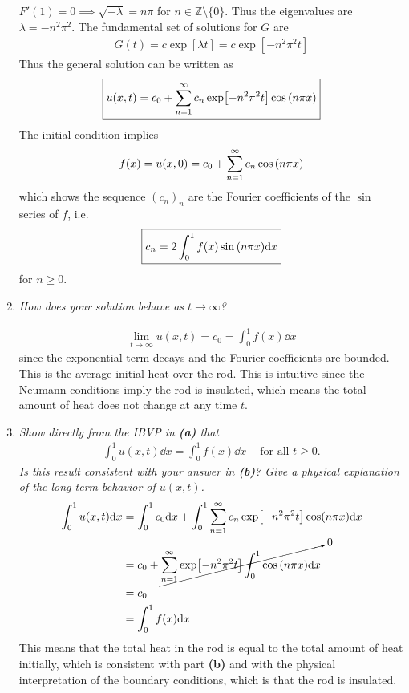 \documentclass[fontsize=11pt]{article} %
\theoremstyle{plain}
\numberwithin{equation}{section} %
\numberwithin{figure}{section} %
\numberwithin{table}{section} %
\begin{document}
\begin{enumerate}[\bf (a)]
        $F'(1) = 0 \implies \sqrt{-\lambda} = n\pi$ for $n \in \mathbb{Z}\setminus\{0\}$.  Thus the eigenvalues are $\lambda = -n^2\pi^2$.  The fundamental set of solutions for $G$ are
        \begin{align*}
            G(t) = c\exp[\lambda t] = c\exp[-n^2\pi^2t]
        \end{align*}
        Thus the general solution can be written as
        \begin{align*}
            \boxed{u(x,t) = c_0 + \sum_{n=1}^\infty c_n \exp[-n^2\pi^2t]\cos\qty(n\pi x)}
        \end{align*}
        The initial condition implies
        \begin{align*}
            f(x) = u(x,0) = c_0 + \sum_{n=1}^\infty c_n \cos\qty(n\pi x)
        \end{align*}
        which shows the sequence $(c_n)_n$ are the Fourier coefficients of the $\sin$ series of $f$, i.e.
        \begin{align*}
            \boxed{c_n = 2\int_0^1 f(x) \sin\qty(n\pi x)\dd x}
        \end{align*}
        for $n \geq 0$.
    \item
        \emph{How does your solution behave as $t \rightarrow \infty$?}

        \begin{align*}
            \lim_{t\rightarrow\infty}u(x,t) = c_0 = \int_0^1 f(x) \dd x
        \end{align*}
        since the exponential term decays and the Fourier coefficients are bounded.  This is the average initial heat over the rod.  This is intuitive since the Neumann conditions imply the rod is insulated, which means the total amount of heat does not change at any time $t$.
    \item
        \emph{Show directly from the IBVP in \textbf{(a)} that}
        \begin{align*}
            \int_0^1 u(x, t) \dd x = \int_0^1 f(x) \dd x\ \ \ \ \text{ for all }t \geq 0.
        \end{align*}
        \emph{Is this result consistent with your answer in \textbf{(b)}?  Give a physical explanation of the long-term behavior of $u(x,t)$.} \\

        \begin{align*}
            \int_0^1 u(x,t) \dd x &= \int_0^1 c_0 \dd x + \int_0^1\sum_{n=1}^\infty c_n \exp[-n^2\pi^2 t]\cos(n\pi x) \dd x \\
            &= c_0 + \cancelto{0}{\sum_{n=1}^\infty\exp[-n^2\pi^2 t]\int_0^1 \cos\qty(n\pi x)\dd x} \\
            &= c_0 \\
            &= \int_0^1 f(x) \dd x
        \end{align*}
        This means that the total heat in the rod is equal to the total amount of heat initially, which is consistent with part \textbf{(b)} and with the physical interpretation of the boundary conditions, which is that the rod is insulated.
\end{enumerate}
\end{document}
